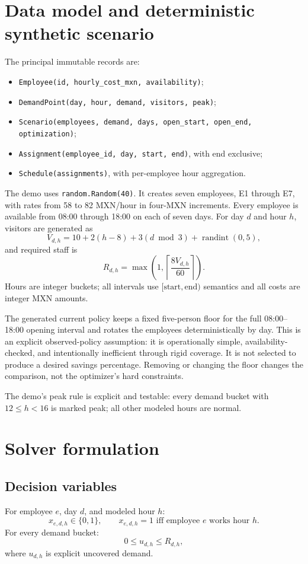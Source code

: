 \documentclass[11pt,a4paper]{article}
\begin{document}
\section{Data model and deterministic synthetic scenario}
The principal immutable records are:
\begin{itemize}
  \item \texttt{Employee(id, hourly\_cost\_mxn, availability)};
\item \texttt{DemandPoint(day, hour, demand, visitors, peak)};
  \item \texttt{Scenario(employees, demand, days, open\_start, open\_end, optimization)};
  \item \texttt{Assignment(employee\_id, day, start, end)}, with end exclusive;
  \item \texttt{Schedule(assignments)}, with per-employee hour aggregation.
\end{itemize}

The demo uses \texttt{random.Random(40)}. It creates seven employees, E1 through E7, with rates from 58 to 82 MXN/hour in four-MXN increments. Every employee is available from 08:00 through 18:00 on each of seven days. For day $d$ and hour $h$, visitors are generated as
\[
V_{d,h}=10+2(h-8)+3(d\bmod 3)+\operatorname{randint}(0,5),
\]
and required staff is
\[
R_{d,h}=\max\left(1,\left\lceil\frac{8V_{d,h}}{60}\right\rceil\right).
\]
Hours are integer buckets; all intervals use $[\text{start},\text{end})$ semantics and all costs are integer MXN amounts.

The generated current policy keeps a fixed five-person floor for the full 08:00--18:00 opening interval and rotates the employees deterministically by day. This is an explicit observed-policy assumption: it is operationally simple, availability-checked, and intentionally inefficient through rigid coverage. It is not selected to produce a desired savings percentage. Removing or changing the floor changes the comparison, not the optimizer's hard constraints.

The demo's peak rule is explicit and testable: every demand bucket with $12\le h<16$ is marked peak; all other modeled hours are normal.

\section{Solver formulation}
\subsection{Decision variables}
For employee $e$, day $d$, and modeled hour $h$:
\[
x_{e,d,h}\in\{0,1\},\qquad x_{e,d,h}=1\text{ iff employee }e\text{ works hour }h.
\]
For every demand bucket:
\[
0\le u_{d,h}\le R_{d,h},
\]
where $u_{d,h}$ is explicit uncovered demand.
\end{document}
